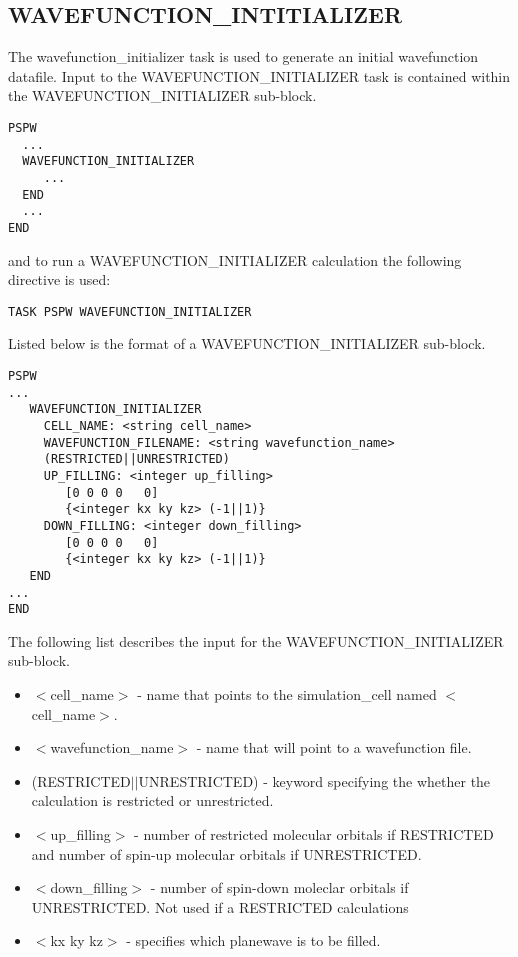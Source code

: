 \subsection{WAVEFUNCTION\_INTITIALIZER}
The wavefunction\_initializer task is used to generate an initial wavefunction
datafile.
Input to the WAVEFUNCTION\_INITIALIZER task is contained
within the WAVEFUNCTION\_INITIALIZER sub-block.
\begin{verbatim}
PSPW
  ...
  WAVEFUNCTION_INITIALIZER
     ...
  END
  ...
END
\end{verbatim}
and to run a WAVEFUNCTION\_INITIALIZER calculation the following directive 
is used:
\begin{verbatim}
TASK PSPW WAVEFUNCTION_INITIALIZER
\end{verbatim}
Listed below is the format of a WAVEFUNCTION\_INITIALIZER sub-block.
\begin{verbatim}
PSPW
... 
   WAVEFUNCTION_INITIALIZER
     CELL_NAME: <string cell_name>
     WAVEFUNCTION_FILENAME: <string wavefunction_name>
     (RESTRICTED||UNRESTRICTED)
     UP_FILLING: <integer up_filling>
        [0 0 0 0   0]
        {<integer kx ky kz> (-1||1)}
     DOWN_FILLING: <integer down_filling>
        [0 0 0 0   0]
        {<integer kx ky kz> (-1||1)}
   END
...
END
\end{verbatim}
The following list describes the input for the WAVEFUNCTION\_INITIALIZER
sub-block.
\begin{itemize}
	\item $<$cell\_name$>$ - name that points 
		to the simulation\_cell named $<$cell\_name$>$.
	\item $<$wavefunction\_name$>$ - name that will point
              to a wavefunction file.
	\item (RESTRICTED$||$UNRESTRICTED) - keyword specifying the whether
              the calculation is restricted or unrestricted.
	\item $<$up\_filling$>$ - number of restricted molecular orbitals if
              RESTRICTED and number of spin-up molecular orbitals if 
              UNRESTRICTED.
        \item $<$down\_filling$>$ - number of spin-down moleclar orbitals if
              UNRESTRICTED.  Not used if a RESTRICTED calculations
        \item $<$kx ky kz$>$ - specifies which planewave is to be filled. 
\end{itemize}



